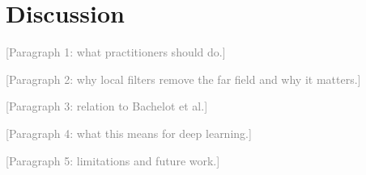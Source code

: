 \documentclass[preprint,12pt,authoryear]{elsarticle}
\newcommand{\towrite}[1]{\textcolor{gray}{[#1]}}
\begin{document}
\section{Discussion}
\label{sec:discussion}

\towrite{Paragraph 1: what practitioners should do.}

\towrite{Paragraph 2: why local filters remove the far field and why it matters.}

\towrite{Paragraph 3: relation to Bachelot et al.}

\towrite{Paragraph 4: what this means for deep learning.}

\towrite{Paragraph 5: limitations and future work.}
\end{document}
